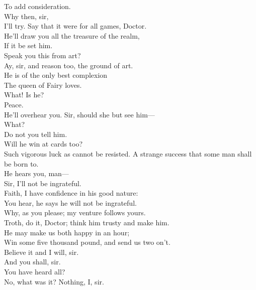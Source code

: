 \documentclass[a4paper,oneside,12pt]{memoir}
\begin{document}
\begin{drama*}
To add consideration.\\
\facespeaks {} Why then, sir,\\
I'll try. Say that it were for all games, Doctor.\\
\subtlespeaks He'll draw you all the treasure of the realm,\\
If it be set him.\\
\facespeaks {} Speak you this from art?\\
\subtlespeaks Ay, sir, and reason too, the ground of art.\\
He is of the only best complexion\\
The queen of Fairy loves.\\
\facespeaks {} What! Is he?\\
\subtlespeaks {} Peace.\\
He'll overhear you. Sir, should she but see him---\\
\facespeaks What?\\
\subtlespeaks {} Do not you tell him.\\
\facespeaks {} Will he win at cards too?\\
\subtlespeaks Such vigorous luck as cannot be resisted.
\facespeaks A strange success that some man shall be born to.\\
\subtlespeaks He hears you, man---\\
\dapperspeaks {} Sir, I'll not be ingrateful.\\
\facespeaks Faith, I have confidence in his good nature:\\
You hear, he says he will not be ingrateful.\\
\subtlespeaks Why, as you please; my venture follows yours.\\
\facespeaks Troth, do it, Doctor; think him trusty and make him.\\
He may make us both happy in an hour;\\
Win some five thousand pound, and send us two on't.\\
\dapperspeaks Believe it and I will, sir.\\
\facespeaks {} And you shall, sir.\\
You have heard all?\\
\dapperspeaks {} No, what was it? Nothing, I, sir.\\

\end{drama*}
\end{document}
